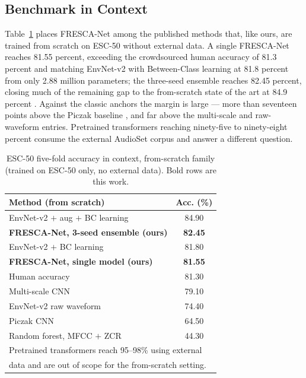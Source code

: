 \documentclass[conference]{IEEEtran}
\begin{document}
\subsection{Benchmark in Context}
Table~\ref{tab:bench} places FRESCA-Net among the published methods that, like ours, are trained from scratch on ESC-50 without external data. A single FRESCA-Net reaches 81.55 percent, exceeding the crowdsourced human accuracy of 81.3 percent \cite{piczak_dataset} and matching EnvNet-v2 with Between-Class learning at 81.8 percent \cite{tokozume_bc} from only 2.88 million parameters; the three-seed ensemble reaches 82.45 percent, closing much of the remaining gap to the from-scratch state of the art at 84.9 percent \cite{tokozume_bc}. Against the classic anchors the margin is large --- more than seventeen points above the Piczak baseline \cite{piczak_cnn}, and far above the multi-scale \cite{zhu_multiscale} and raw-waveform \cite{tokozume_envnet} entries. Pretrained transformers reaching ninety-five to ninety-eight percent consume the external AudioSet corpus \cite{gemmeke_audioset} and answer a different question.

\begin{table}[t]
\caption{ESC-50 five-fold accuracy in context, from-scratch family (trained on ESC-50 only, no external data). Bold rows are this work.}
\label{tab:bench}
\begin{center}
\renewcommand{\arraystretch}{1.05}
\begin{tabular}{|l|c|}
\hline
\textbf{Method (from scratch)} & \textbf{Acc. (\%)} \\
\hline
EnvNet-v2 $+$ aug $+$ BC learning \cite{tokozume_bc} & 84.90 \\
\textbf{FRESCA-Net, 3-seed ensemble (ours)} & \textbf{82.45} \\
EnvNet-v2 $+$ BC learning \cite{tokozume_bc} & 81.80 \\
\textbf{FRESCA-Net, single model (ours)} & \textbf{81.55} \\
Human accuracy \cite{piczak_dataset} & 81.30 \\
Multi-scale CNN \cite{zhu_multiscale} & 79.10 \\
EnvNet-v2 raw waveform \cite{tokozume_envnet} & 74.40 \\
Piczak CNN \cite{piczak_cnn} & 64.50 \\
Random forest, MFCC $+$ ZCR \cite{piczak_dataset} & 44.30 \\
\hline
\multicolumn{2}{l}{\footnotesize Pretrained transformers reach 95--98\% using external} \\
\multicolumn{2}{l}{\footnotesize data \cite{kong_panns,gong_ast,chen_beats,elizalde_clap} and are out of scope for the from-scratch setting.} \\
\end{tabular}
\end{center}
\end{table}
\end{document}
